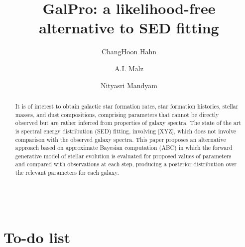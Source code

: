 \documentclass[12pt, onecolumn]{emulateapj}
\begin{document}
\begin{align}
\end{align}

\title{GalPro: a likelihood-free alternative to SED fitting}

\author{ChangHoon Hahn}
\author{A.I. Malz}
\author{Nityasri Mandyam}

\begin{abstract}
It is of interest to obtain galactic star formation rates, star formation histories, stellar masses, and dust compositions, comprising parameters that cannot be directly observed but are rather inferred from properties of galaxy spectra.  The state of the art is spectral energy distribution (SED) fitting, involving [XYZ], which does not involve comparison with the observed galaxy spectra.  This paper proposes an alternative approach based on approximate Bayesian computation (ABC) in which the forward generative model of stellar evolution is evaluated for proposed values of parameters and compared with observations at each step, producing a posterior distribution over the relevant parameters for each galaxy.
\end{abstract}


\section*{To-do list}
\begin{enumerate}
\end{enumerate}

\acknowledgments{}

\appendix{}


\end{document}
